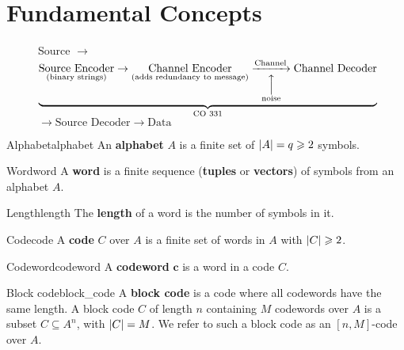 \section{Fundamental Concepts}

\begin{figure}[h]
    \centering
    Source
    $ \rightarrow $
    $ \underbrace{
            \underset{\text{(binary strings)}}{\text{Source Encoder}}
            \rightarrow
            \underset{\text{(adds redundancy to message)}}{\text{Channel Encoder}}
            \underset{\overset{\Big\uparrow}{\text{noise}}}{\xrightarrow{\text{Channel}}}
            \text{Channel Decoder}}_{\text{CO 331}}$
    $ \rightarrow \text{Source Decoder} \rightarrow \text{Data} $
\end{figure}

\begin{Definition}{Alphabet}{alphabet}
    An \textbf{alphabet} $ A $ is a finite set of $ \lvert A\rvert= q\geqslant 2 $ symbols.
\end{Definition}

\begin{Definition}{Word}{word}
    A \textbf{word} is a finite sequence (\textbf{tuples} or \textbf{vectors})
    of symbols from an alphabet $ A $.
\end{Definition}

\begin{Definition}{Length}{length}
    The \textbf{length} of a word is the number of symbols in it.
\end{Definition}

\begin{Definition}{Code}{code}
    A \textbf{code} $ C $ over $ A $ is a finite set of words in $ A $
    with $ \lvert C\rvert\geqslant 2 $.
\end{Definition}

\begin{Definition}{Codeword}{codeword}
    A \textbf{codeword} $ \symbf{c} $ is a word in a code $ C $.
\end{Definition}

\begin{Definition}{Block code}{block_code}
    A \textbf{block code} is a code where all codewords have the same length.
    A block code $ C $ of length $ n $ containing $ M $ codewords over $ A $
    is a subset $ C\subseteq A^n $, with $ \lvert C\rvert=M $. We refer to such a block
    code as an $ [n,M] $-code over $ A $.
\end{Definition}


